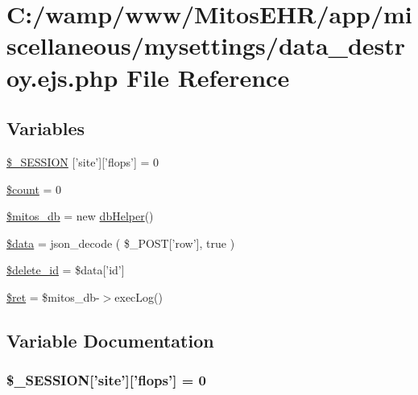 \hypertarget{miscellaneous_2mysettings_2data__destroy_8ejs_8php}{\section{\-C\-:/wamp/www/\-Mitos\-E\-H\-R/app/miscellaneous/mysettings/data\-\_\-destroy.ejs.\-php \-File \-Reference}
\label{miscellaneous_2mysettings_2data__destroy_8ejs_8php}
}
\subsection*{\-Variables}
\begin{DoxyCompactItemize}
\item 
\hyperlink{miscellaneous_2mysettings_2data__destroy_8ejs_8php_a99fda8552a3e58235643b79f5af3ded8}{\$\-\_\-\-S\-E\-S\-S\-I\-O\-N} \mbox{[}'site'\mbox{]}\mbox{[}'flops'\mbox{]} = 0
\item 
\hyperlink{miscellaneous_2mysettings_2data__destroy_8ejs_8php_af789423037bbc89dc7c850e761177570}{\$count} = 0
\item 
\hyperlink{miscellaneous_2mysettings_2data__destroy_8ejs_8php_ab5d961f93efe4e2e8d8374f01dd6c65a}{\$mitos\-\_\-db} = new \hyperlink{classdb_helper}{db\-Helper}()
\item 
\hyperlink{miscellaneous_2mysettings_2data__destroy_8ejs_8php_a6efc15b5a2314dd4b5aaa556a375c6d6}{\$data} = json\-\_\-decode ( \$\-\_\-\-P\-O\-S\-T\mbox{[}'row'\mbox{]}, true )
\item 
\hyperlink{miscellaneous_2mysettings_2data__destroy_8ejs_8php_a932840e24cb4db95716f8f5c96f22051}{\$delete\-\_\-id} = \$data\mbox{[}'id'\mbox{]}
\item 
\hyperlink{miscellaneous_2mysettings_2data__destroy_8ejs_8php_affd9e3eb0aad0a7ca42912cd925f148c}{\$ret} = \$mitos\-\_\-db-\/$>$exec\-Log()
\end{DoxyCompactItemize}


\subsection{\-Variable \-Documentation}
\hypertarget{miscellaneous_2mysettings_2data__destroy_8ejs_8php_a99fda8552a3e58235643b79f5af3ded8}{
\subsubsection[{\$\-\_\-\-S\-E\-S\-S\-I\-O\-N}]{\setlength{\rightskip}{0pt plus 5cm}\$\-\_\-\-S\-E\-S\-S\-I\-O\-N\mbox{[}'site'\mbox{]}\mbox{[}'flops'\mbox{]} = 0}}\label{miscellaneous_2mysettings_2data__destroy_8ejs_8php_a99fda8552a3e58235643b79f5af3ded8}


